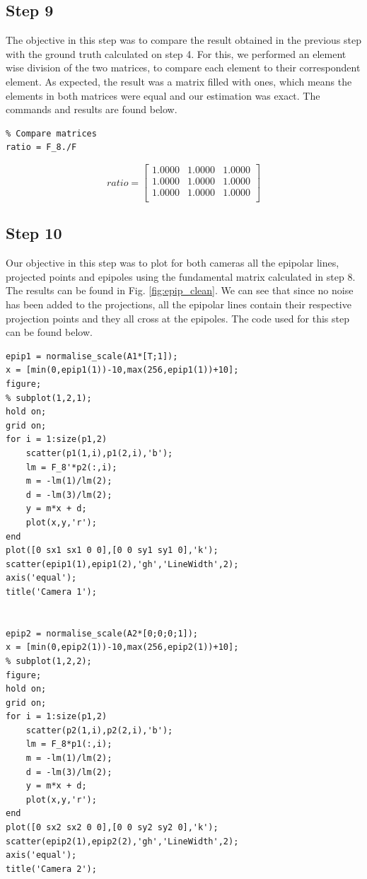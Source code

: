 \documentclass[peerreview,11pt]{IEEEtran}
\begin{document}
\subsection{Step 9}

The objective in this step was to compare the result obtained in the previous step with the ground truth calculated on step 4. For this, we performed an element wise division of the two matrices, to compare each element to their correspondent element. As expected, the result was a matrix filled with ones, which means the elements in both matrices were equal and our estimation was exact. The commands and results are found below.

\begin{verbatim}
% Compare matrices
ratio = F_8./F
\end{verbatim}


\[
ratio = 
\begin{bmatrix}
    1.0000  &  1.0000  &  1.0000\\
    1.0000  &  1.0000  &  1.0000\\
    1.0000  &  1.0000  &  1.0000\\
\end{bmatrix}
\]



\subsection{Step 10}

Our objective in this step was to plot for both cameras all the epipolar lines, projected points and epipoles using the fundamental matrix calculated in step 8. The results can be found in Fig. \ref{fig:epip_clean}. We can see that since no noise has been added to the projections, all the epipolar lines contain their respective projection points and they all cross at the epipoles. The code used for this step can be found below.

\begin{verbatim}
epip1 = normalise_scale(A1*[T;1]);
x = [min(0,epip1(1))-10,max(256,epip1(1))+10];
figure;
% subplot(1,2,1);
hold on;
grid on;
for i = 1:size(p1,2)
    scatter(p1(1,i),p1(2,i),'b');
    lm = F_8'*p2(:,i);
    m = -lm(1)/lm(2);
    d = -lm(3)/lm(2);
    y = m*x + d;
    plot(x,y,'r');
end
plot([0 sx1 sx1 0 0],[0 0 sy1 sy1 0],'k');
scatter(epip1(1),epip1(2),'gh','LineWidth',2);
axis('equal');
title('Camera 1');


epip2 = normalise_scale(A2*[0;0;0;1]);
x = [min(0,epip2(1))-10,max(256,epip2(1))+10];
% subplot(1,2,2);
figure;
hold on;
grid on;
for i = 1:size(p1,2)
    scatter(p2(1,i),p2(2,i),'b');
    lm = F_8*p1(:,i);
    m = -lm(1)/lm(2);
    d = -lm(3)/lm(2);
    y = m*x + d;
    plot(x,y,'r');
end
plot([0 sx2 sx2 0 0],[0 0 sy2 sy2 0],'k');
scatter(epip2(1),epip2(2),'gh','LineWidth',2);
axis('equal');
title('Camera 2');
\end{verbatim}
\end{document}
